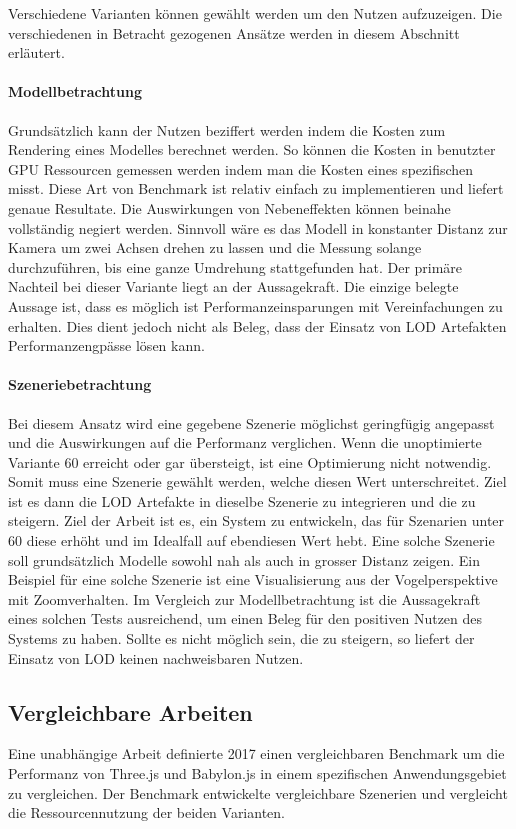 Verschiedene Varianten können gewählt werden um den Nutzen aufzuzeigen. Die verschiedenen in Betracht gezogenen Ansätze werden in diesem Abschnitt erläutert.

\paragraph{Modellbetrachtung}
Grundsätzlich kann der Nutzen beziffert werden indem die Kosten zum Rendering eines Modelles berechnet werden. So können die Kosten in benutzter GPU Ressourcen gemessen werden indem man die Kosten eines spezifischen  misst. Diese Art von Benchmark ist relativ einfach zu implementieren und liefert genaue Resultate. Die Auswirkungen von Nebeneffekten können beinahe vollständig negiert werden.
Sinnvoll wäre es das Modell in konstanter Distanz zur Kamera um zwei Achsen drehen zu lassen und die Messung solange durchzuführen, bis eine ganze Umdrehung stattgefunden hat.
Der primäre Nachteil bei dieser Variante liegt an der Aussagekraft. Die einzige belegte Aussage ist, dass es möglich ist Performanzeinsparungen mit Vereinfachungen zu erhalten. Dies dient jedoch nicht als Beleg, dass der Einsatz von LOD Artefakten Performanzengpässe lösen kann.

\paragraph{Szeneriebetrachtung}
Bei diesem Ansatz wird eine gegebene Szenerie möglichst geringfügig angepasst und die Auswirkungen auf die Performanz verglichen.
Wenn die unoptimierte Variante 60  erreicht oder gar übersteigt, ist eine Optimierung nicht notwendig. Somit muss eine Szenerie gewählt werden, welche diesen Wert unterschreitet. 
Ziel ist es dann die LOD Artefakte in dieselbe Szenerie zu integrieren und die  zu steigern. Ziel der Arbeit ist es, ein System zu entwickeln, das für Szenarien unter 60  diese erhöht und im Idealfall auf ebendiesen Wert hebt.
Eine solche Szenerie soll grundsätzlich Modelle sowohl nah als auch in grosser Distanz zeigen. Ein Beispiel für eine solche Szenerie ist eine Visualisierung aus der Vogelperspektive mit Zoomverhalten.
Im Vergleich zur Modellbetrachtung ist die Aussagekraft eines solchen Tests ausreichend, um einen Beleg für den positiven Nutzen des Systems zu haben. Sollte es nicht möglich sein, die  zu steigern, so liefert der Einsatz von LOD keinen nachweisbaren Nutzen.

\subsection{Vergleichbare Arbeiten}
Eine unabhängige Arbeit definierte 2017 einen vergleichbaren Benchmark um die Performanz von Three.js und Babylon.js in einem spezifischen Anwendungsgebiet zu vergleichen. Der Benchmark entwickelte vergleichbare Szenerien und vergleicht die Ressourcennutzung der beiden Varianten. \cite{performanceComparisonBabylonThreejs}
